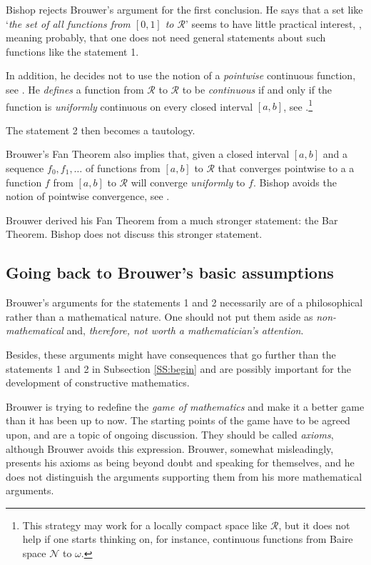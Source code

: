 \documentclass[a4paper]{amsart}
\theoremstyle{plain}
\begin{document}
Bishop rejects Brouwer's argument  for the first conclusion. He says that a set like `{\it the set  of all functions from $[0,1]$ to $\mathcal{R}$}' seems to have little practical interest, \cite[p. 67]{bishopbridges85}, meaning probably, that one does not need general statements about such functions like the statement 1. 

In addition, he decides not to use   the notion of a {\it pointwise} continuous function, see \cite[page 66]{bishopbridges85}.
He {\it defines} a function from $\mathcal{R}$ to $\mathcal{R}$ to be {\it continuous} if and only if  the function is {\it uniformly} continuous on every closed interval $[a,b]$, see \cite[Chapter 2, Definition 4.5]{bishopbridges85}.\footnote{This strategy may work for a locally compact space like $\mathcal{R}$, but it does not help if one starts thinking on, for instance, continuous functions from Baire space $\mathcal{N}$ to $\omega$.} 

The statement 2 then becomes a tautology.

Brouwer's Fan Theorem also implies that, given a closed interval $[a,b]$ and a sequence $f_0, f_1, \ldots$ of functions from $[a,b]$ to $\mathcal{R}$ that converges pointwise to a a function $f$ from $[a,b]$ to $\mathcal{R}$ will converge {\it uniformly} to $f$. Bishop avoids the notion of pointwise convergence, see  \cite[Chapter 2, Definition 4.7]{bishopbridges85}. 

Brouwer derived his Fan Theorem from a much stronger statement: the Bar Theorem. Bishop does not discuss this stronger statement.

\subsection{Going back to Brouwer's basic assumptions} 

Brouwer's arguments for the statements 1 and 2 necessarily are of a philosophical rather  than a mathematical nature. One should not put them aside  as {\it non-mathematical} and, {\it therefore,  not worth a mathematician's attention}. 

Besides, these arguments might have  consequences that go further than the statements 1 and 2 in Subsection \ref{SS:begin} and are possibly important for the development of constructive mathematics.

 Brouwer is trying  to redefine the  {\it game of mathematics} and make it a better game than it has been up to now.   The starting points of the game have to be agreed upon, and  are a topic of ongoing discussion. They should be called {\it axioms}, although Brouwer avoids this expression.  Brouwer, somewhat misleadingly, presents his axioms as being beyond doubt and speaking for themselves, and he does not distinguish the arguments supporting them from his more mathematical arguments.  
\end{document}

